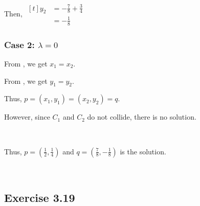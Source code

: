 Then, $\begin{aligned}[t]
    y_2 & = -\frac{7}{8} + \frac{3}{4} \\
        & = -\frac{1}{8}
\end{aligned}$

\subsubsection*{Case 2: $\lambda = 0$}

From , we get $x_1 = x_2$. 

From , we get $y_1 = y_2$. 

Thus, $p = (x_1, y_1) = (x_2, y_2) = q$. 

However, since $C_1$ and $C_2$ do not collide, there is no solution. 

{~~~}

Thus, $p = (\frac{1}{2}, \frac{1}{4})$ and $q = (\frac{7}{8}, -\frac{1}{8})$ is the solution. 

{~~~}

\subsection*{Exercise 3.19}

